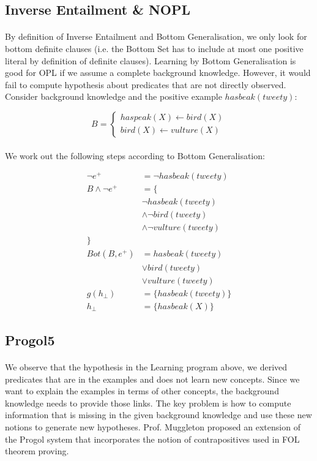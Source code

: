 \documentclass{article}
\theoremstyle{plain}
\theoremstyle{definition}
\begin{document}
\begin{multicols}{2}
\subsection{Inverse Entailment \& NOPL}

\paragraph{} By definition of Inverse Entailment and Bottom Generalisation, we only look for bottom definite clauses (i.e. the Bottom Set has to include at most one positive literal by definition of definite clauses). Learning by Bottom Generalisation is good for OPL if we assume a complete background knowledge. However, it would fail to compute hypothesis about predicates that are not directly observed. Consider background knowledge and the positive example $hasbeak(tweety)$:

\[
B = \begin{cases}
haspeak(X) \leftarrow bird(X)\\
bird(X) \leftarrow vulture(X)
\end{cases}
\]

\paragraph{} We work out the following steps according to Bottom Generalisation:

\begin{align*}
\lnot e^+ &= \lnot hasbeak(tweety)\\
B \land \lnot e^+ &= \{\\
& \lnot hasbeak(tweety)\\
& \land \lnot bird(tweety) \\
& \land \lnot vulture(tweety)\\
\}&\\
Bot(B, e^+) &= hasbeak(tweety)\\
& \lor bird(tweety)\\
& \lor vulture(tweety)\\
g(h_{\perp}) &= \{ hasbeak(tweety) \}\\
h_{\perp} &= \{ hasbeak(X) \}
\end{align*}

\subsection{Progol5}

\paragraph{} We observe that the hypothesis in the Learning program above, we derived predicates that are in the examples and does not learn new concepts. Since we want to explain the examples in terms of other concepts, the background knowledge needs to provide those links. The key problem is how to compute information that is missing in the given background knowledge and use these new notions to generate new hypotheses. Prof. Muggleton proposed an extension of the Progol system that incorporates the notion of contrapositives used in FOL theorem proving\cite{muggleton00}.


\end{multicols}
\end{document}
